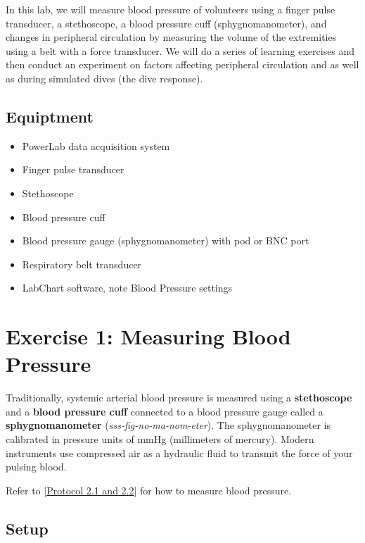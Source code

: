 \documentclass[
  letterpaper,
  DIV=11,
  numbers=noendperiod,
  oneside]{scrartcl}
\providecommand{\tightlist}{%
  \setlength{\itemsep}{0pt}\setlength{\parskip}{0pt}}\usepackage{longtable,booktabs,array}
\begin{document}
In this lab, we will measure blood pressure of volunteers using a finger
pulse transducer, a stethoscope, a blood pressure cuff
(sphygnomanometer), and changes in peripheral circulation by measuring
the volume of the extremities using a belt with a force transducer. We
will do a series of learning exercises and then conduct an experiment on
factors affecting peripheral circulation and as well as during simulated
dives (the dive response).

\hypertarget{equiptment}{%
\subsection{Equiptment}\label{equiptment}}

\begin{itemize}
\tightlist
\item
  PowerLab data acquisition system
\item
  Finger pulse transducer
\item
  Stethoscope
\item
  Blood pressure cuff
\item
  Blood pressure gauge (sphygnomanometer) with pod or BNC port
\item
  Respiratory belt transducer
\item
  LabChart software, note Blood Pressure settings
\end{itemize}

\hypertarget{exercise-1-measuring-blood-pressure}{%
\section{Exercise 1: Measuring Blood
Pressure}\label{exercise-1-measuring-blood-pressure}}

Traditionally, systemic arterial blood pressure is measured using a
\textbf{stethoscope} and a \textbf{blood pressure cuff} connected to a
blood pressure gauge called a \textbf{sphygnomanometer}
(\emph{sss-fig-no-ma-nom-eter}). The sphygnomanometer is calibrated in
pressure units of mmHg (millimeters of mercury). Modern instruments use
compressed air as a hydraulic fluid to transmit the force of your
pulsing blood.

Refer to {[}\href{../Protocols/p2-measuring-blood-pressure.pdf}{Protocol
2.1 and 2.2}{]} for how to measure blood pressure.

\hypertarget{setup}{%
\subsection{Setup}\label{setup}}
\end{document}
